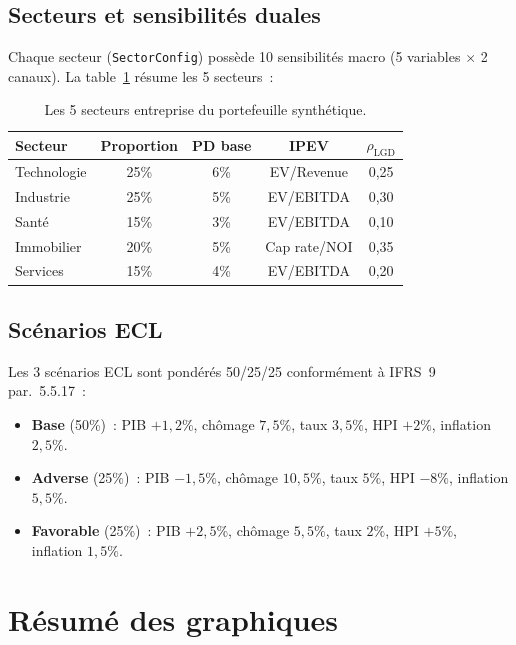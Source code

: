 \documentclass[12pt,a4paper]{article}
\begin{document}
\subsection{Secteurs et sensibilit\'es duales}

Chaque secteur (\texttt{SectorConfig}) poss\`ede 10 sensibilit\'es macro (5 variables $\times$ 2 canaux). La table~\ref{tab:sectors} r\'esume les 5 secteurs~:

\begin{table}[ht]
\centering
\caption{Les 5 secteurs entreprise du portefeuille synth\'etique.}
\label{tab:sectors}
\small
\begin{tabular}{@{}lcccc@{}}
\toprule
\textbf{Secteur} & \textbf{Proportion} & \textbf{PD base} & \textbf{IPEV} & \textbf{$\rho_{\text{LGD}}$} \\
\midrule
Technologie & 25\% & 6\% & EV/Revenue & 0,25 \\
Industrie & 25\% & 5\% & EV/EBITDA & 0,30 \\
Sant\'e & 15\% & 3\% & EV/EBITDA & 0,10 \\
Immobilier & 20\% & 5\% & Cap rate/NOI & 0,35 \\
Services & 15\% & 4\% & EV/EBITDA & 0,20 \\
\bottomrule
\end{tabular}
\end{table}

\subsection{Sc\'enarios ECL}

Les 3 sc\'enarios ECL sont pond\'er\'es 50/25/25 conform\'ement \`a IFRS~9 par.~5.5.17~:
\begin{itemize}[leftmargin=2em]
    \item \textbf{Base} (50\%)~: PIB $+1{,}2\%$, ch\^omage $7{,}5\%$, taux $3{,}5\%$, HPI $+2\%$, inflation $2{,}5\%$.
    \item \textbf{Adverse} (25\%)~: PIB $-1{,}5\%$, ch\^omage $10{,}5\%$, taux $5\%$, HPI $-8\%$, inflation $5{,}5\%$.
    \item \textbf{Favorable} (25\%)~: PIB $+2{,}5\%$, ch\^omage $5{,}5\%$, taux $2\%$, HPI $+5\%$, inflation $1{,}5\%$.
\end{itemize}


\section{R\'esum\'e des graphiques}
\label{sec:chart_summary}
\end{document}
